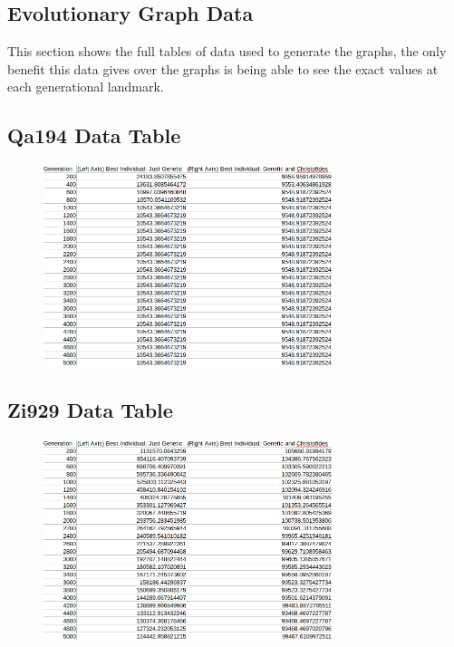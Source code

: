 \documentclass[11pt,a4paper,titlepage]{article}
\begin{document}
\begin{appendices}

\section{Evolutionary Graph Data}
This section shows the full tables of data used to generate the graphs, the only benefit this data gives over the graphs is being able to see the exact values at each generational landmark.
\pagebreak

\subsection{Qa194 Data Table}

\begin{figure}[ht]
	\includegraphics[width=0.75\textwidth]{qa194Table}
	\centering
\end{figure}

\pagebreak

\subsection{Zi929 Data Table}


\begin{figure}[ht]
	\includegraphics[width=0.75\textwidth]{zi929Table}
	\centering
\end{figure}


\end{appendices}
\end{document}
